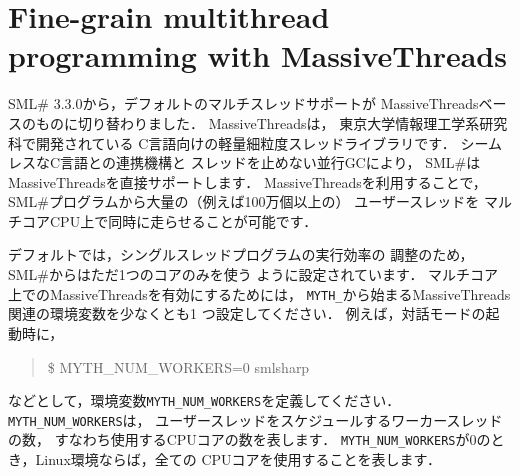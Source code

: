 \documentclass{jbook}
\newcommand{\txt}[2]{#2}
\newcommand{\smlsharp}{SML\#}
\newenvironment{program}{\begin{quote}\begin{tt}}%
                        {\end{tt}\end{quote}}
\begin{document}
\section{\txt{MassiveThreadsを用いた細粒度スレッドプログラミング}
{Fine-grain multithread programming with MassiveThreads}}

\ifjp%
	\smlsharp{} 3.3.0から，デフォルトのマルチスレッドサポートが
MassiveThreadsベースのものに切り替わりました．
	MassiveThreadsは，
東京大学情報理工学系研究科で開発されている
C言語向けの軽量細粒度スレッドライブラリです．
	シームレスなC言語との連携機構と
スレッドを止めない並行GCにより，
\smlsharp{}はMassiveThreadsを直接サポートします．
	MassiveThreadsを利用することで，
\smlsharp{}プログラムから大量の（例えば100万個以上の）
ユーザースレッドを
マルチコアCPU上で同時に走らせることが可能です．

	デフォルトでは，シングルスレッドプログラムの実行効率の
調整のため，\smlsharp{}からはただ1つのコアのみを使う
ように設定されています．
	マルチコア上でのMassiveThreadsを有効にするためには，
\verb|MYTH_|から始まるMassiveThreads関連の環境変数を少なくとも1
つ設定してください．
	例えば，対話モードの起動時に，
\begin{program}
\$ MYTH\_NUM\_WORKERS=0 smlsharp
\end{program}
などとして，環境変数\verb|MYTH_NUM_WORKERS|を定義してください．
	\verb|MYTH_NUM_WORKERS|は，
ユーザースレッドをスケジュールするワーカースレッドの数，
すなわち使用するCPUコアの数を表します．
	\verb|MYTH_NUM_WORKERS|が0のとき，Linux環境ならば，全ての
CPUコアを使用することを表します．
\end{document}
